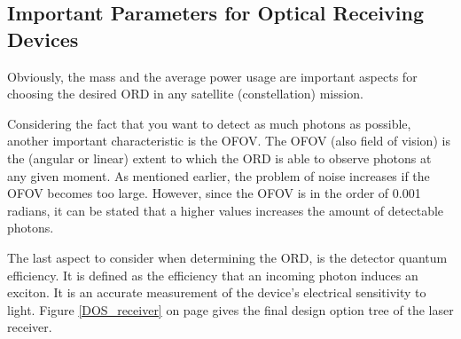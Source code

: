 \subsection{Important Parameters for Optical Receiving Devices}
	\label{blDOparametersORD}
Obviously, the mass and the average power usage are important aspects for choosing the desired \acs{ORD} in any satellite (constellation) mission. 

Considering the fact that you want to detect as much photons as possible, another important characteristic is the \ac{OFOV}. The \acs{OFOV} (also field of vision) is the (angular or linear) extent to which the \acs{ORD} is able to observe photons at any given moment. As mentioned earlier, the problem of noise increases if the \acs{OFOV} becomes too large. However, since the \acs{OFOV} is in the order of 0.001 radians, it can be stated that a higher values increases the amount of detectable photons.

The last aspect to consider when determining the \acs{ORD}, is the detector quantum efficiency. It is defined as the efficiency that an incoming photon induces an exciton. It is an accurate measurement of the device's electrical sensitivity to light. 
Figure \ref{DOS_receiver} on page \pageref{DOS_receiver} gives the final design option tree of the laser receiver.
